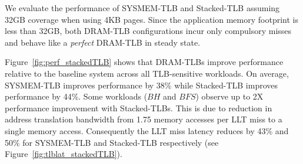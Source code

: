 
\noindent We evaluate the performance of SYSMEM-TLB and Stacked-TLB
assuming 32GB coverage when using 4KB pages. Since the application
memory footprint is less than 32GB, both DRAM-TLB configurations incur
only compulsory misses and behave like a {\em perfect} DRAM-TLB in
steady state.


Figure~\ref{fig:perf_stackedTLB} shows that DRAM-TLBs improve
performance relative to the baseline system across all TLB-sensitive
workloads. On average, SYSMEM-TLB improves performance by 38\% while
Stacked-TLB improves performance by 44\%. Some workloads ($BH$ and
$BFS$) observe up to 2X performance improvement with Stacked-TLBs.
This is due to reduction in address translation bandwidth from 1.75
memory accesses per LLT miss to a single memory access. Consequently
the LLT miss latency reduces by 43\% and 50\% for SYSMEM-TLB and
Stacked-TLB respectively (see Figure~\ref{fig:tlblat_stackedTLB}).

